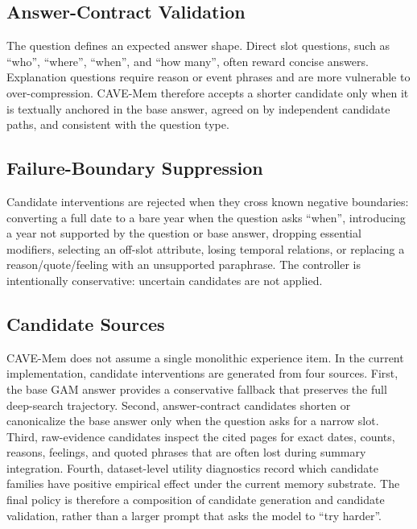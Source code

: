 \documentclass[conference]{IEEEtran}
\newcommand{\method}{CAVE-Mem}
\begin{document}
\subsection{Answer-Contract Validation}
The question defines an expected answer shape. Direct slot questions, such as
``who'', ``where'', ``when'', and ``how many'', often reward concise answers.
Explanation questions require reason or event phrases and are more vulnerable
to over-compression. \method{} therefore accepts a shorter candidate only when
it is textually anchored in the base answer, agreed on by independent candidate
paths, and consistent with the question type.

\subsection{Failure-Boundary Suppression}
Candidate interventions are rejected when they cross known negative
boundaries: converting a full date to a bare year when the question asks
``when'', introducing a year not supported by the question or base answer,
dropping essential modifiers, selecting an off-slot attribute, losing temporal
relations, or replacing a reason/quote/feeling with an unsupported paraphrase.
The controller is intentionally conservative: uncertain candidates are not
applied.

\subsection{Candidate Sources}
\method{} does not assume a single monolithic experience item. In the current
implementation, candidate interventions are generated from four sources. First,
the base GAM answer provides a conservative fallback that preserves the full
deep-search trajectory. Second, answer-contract candidates shorten or
canonicalize the base answer only when the question asks for a narrow slot.
Third, raw-evidence candidates inspect the cited pages for exact dates,
counts, reasons, feelings, and quoted phrases that are often lost during
summary integration. Fourth, dataset-level utility diagnostics record which
candidate families have positive empirical effect under the current memory
substrate. The final policy is therefore a composition of candidate generation
and candidate validation, rather than a larger prompt that asks the model to
``try harder''.
\end{document}
